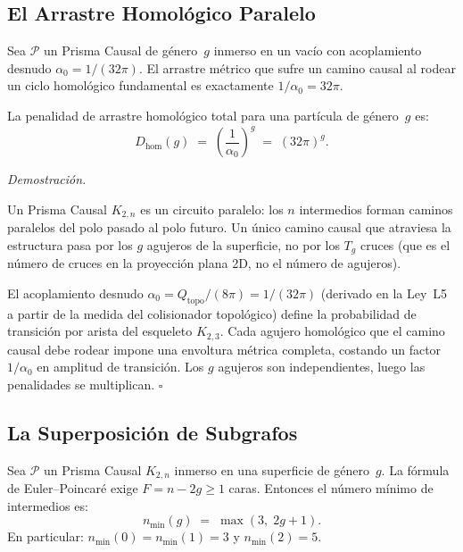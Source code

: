 \documentclass[11pt, a4paper, openany]{book}
\renewenvironment{proof}[1][Demostraci\'on]{%
  \par\noindent\textit{#1.}\quad
}{\hfill$\square$\par\medskip}
\begin{document}
\subsection{El Arrastre Homol\'ogico Paralelo}

\begin{theorem}
\label{thm:homology-drag}
Sea $\mathcal{P}$ un Prisma Causal de g\'enero~$g$ inmerso en un
vac\'io con acoplamiento desnudo $\alpha_0 = 1/(32\pi)$. El arrastre
m\'etrico que sufre un camino causal al rodear un ciclo homol\'ogico
fundamental es exactamente $1/\alpha_0 = 32\pi$.

La penalidad de arrastre homol\'ogico total para una part\'icula de
g\'enero~$g$ es:
\[
  D_{\mathrm{hom}}(g) \;=\; \left(\frac{1}{\alpha_0}\right)^{\!g}
  \;=\; (32\pi)^g.
\]
\end{theorem}

\begin{proof}
Un Prisma Causal $K_{2,n}$ es un circuito paralelo: los $n$
intermedios forman caminos paralelos del polo pasado al polo futuro.
Un \'unico camino causal que atraviesa la estructura pasa por los
$g$ agujeros de la superficie, no por los $T_g$ cruces (que es el
n\'umero de cruces en la proyecci\'on plana 2D, no el n\'umero de
agujeros).

El acoplamiento desnudo $\alpha_0 = Q_{\mathrm{topo}}/(8\pi) =
1/(32\pi)$ (derivado en la Ley~L5 a partir de la medida del colisionador
topol\'ogico) define la probabilidad de transici\'on por arista del
esqueleto $K_{2,3}$. Cada agujero homol\'ogico que el camino causal debe
rodear impone una envoltura m\'etrica completa, costando un factor
$1/\alpha_0$ en amplitud de transici\'on. Los $g$ agujeros son
independientes, luego las penalidades se multiplican.
\end{proof}

\subsection{La Superposici\'on de Subgrafos}

\begin{theorem}
\label{thm:euler-floor}
Sea $\mathcal{P}$ un Prisma Causal $K_{2,n}$ inmerso en una
superficie de g\'enero~$g$. La f\'ormula de Euler--Poincar\'e exige
$F = n - 2g \ge 1$ caras. Entonces el n\'umero m\'inimo de
intermedios es:
\[
  n_{\min}(g) \;=\; \max(3,\; 2g + 1).
\]
En particular: $n_{\min}(0) = n_{\min}(1) = 3$ y
$n_{\min}(2) = 5$.
\end{theorem}
\end{document}
